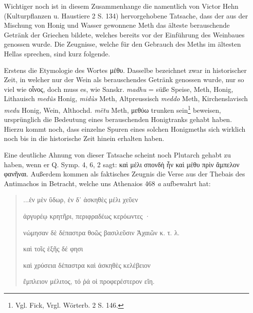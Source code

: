 \documentclass[a4paper, 11pt, oneside]{article}
\begin{document}
Wichtiger noch ist in diesem Zusammenhange die namentlich von Victor Hehn (Kulturpflanzen u. Haustiere 2 S. 134) hervorgehobene Tatsache, dass der aus der Mischung von Honig und Wasser gewonnene Meth das älteste berauschende Getränk der Griechen bildete, welches bereits vor der Einführung des Weinbaues genossen wurde. Die Zeugnisse, welche für den Gebrauch des Meths im ältesten Hellas sprechen, sind kurz folgende.

Erstens die Etymologie des Wortes μέθυ. Dasselbe bezeichnet zwar in historischer Zeit, in welcher nur der Wein als berauschendes Getränk genossen wurde, nur so viel wie οἶνος, doch muss es, wie Sanskr. \emph{madhu} = süße Speise, Meth, Honig, Lithauisch \emph{medûs} Honig, \emph{midùs} Meth, Altpreussisch \emph{meddo} Meth, Kirchenslavisch \emph{medu} Honig, Wein, Althochd. \emph{mëtu} Meth, μεθύω trunken sein\footnote{Vgl. Fick, Vrgl. Wörterb. 2 S. 146.} beweisen, ursprünglich die Bedeutung eines berauschenden Honigtranks gehabt haben. Hierzu kommt noch, dass einzelne Spuren eines solchen Honigmeths sich wirklich noch bis in die historische Zeit hinein erhalten haben.

Eine deutliche Ahnung von dieser Tatsache scheint noch Plutarch gehabt zu haben, wenn er Q. Symp. 4, 6, 2 sagt: καὶ μέλι σπονδὴ ἦν καὶ μέθυ πρὶν ἄμπελον φανῆναι. Außerdem kommen als faktisches Zeugnis die Verse aus der Thebais des Antimachos in Betracht, welche uns Athenaios 468 \emph{a} aufbewahrt hat:
\begin{quotation}\large
...ἐν μὲν ὕδωρ, ἐν δ᾽ ἀσκηθὲς μέλι χεῦεν

ἀργυρέῳ κρητῆρι, περιφραδέως κερόωντες ·

νώμησαν δὲ δέπαστρα θοῶς βασιλεῦσιν Ἀχαιῶν κ. τ. λ.

\bigskip

\hspace*{15mm}καὶ τοῖς ἑξῆς δέ φησι

καὶ χρύσεια δέπαστρα καὶ ἀσκηθὲς κελέβειον

ἔμπλειον μέλιτος, τό ῥά οἱ προφερέστερον εἴη.
\end{quotation}
\end{document}
